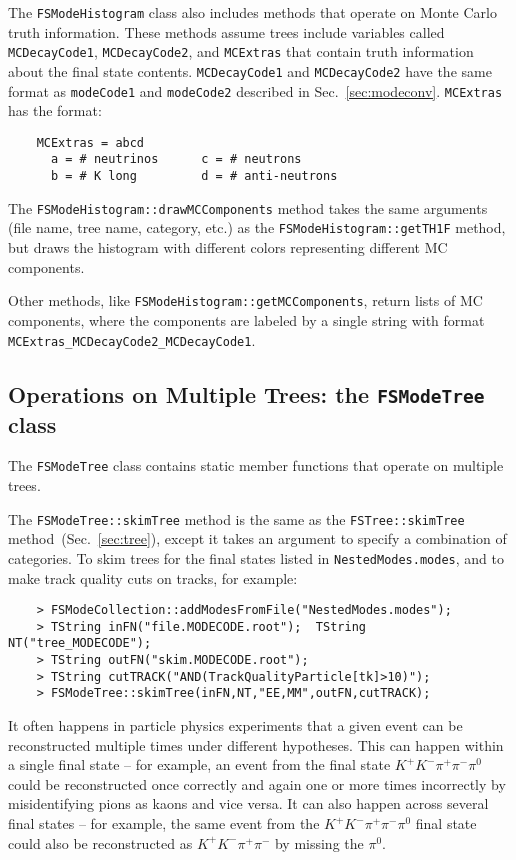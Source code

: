 \documentclass[11pt]{article}
\begin{document}
The {\tt FSModeHistogram} class also includes methods that operate on Monte Carlo truth information.  These methods assume trees include variables called {\tt MCDecayCode1}, {\tt MCDecayCode2}, and {\tt MCExtras} that contain truth information about the final state contents.  {\tt MCDecayCode1} and {\tt MCDecayCode2} have the same format as {\tt modeCode1} and {\tt modeCode2} described in Sec.~\ref{sec:modeconv}. {\tt MCExtras} has the format:
\begin{verbatim}
    MCExtras = abcd
      a = # neutrinos      c = # neutrons    
      b = # K long         d = # anti-neutrons
\end{verbatim}

The {\tt FSModeHistogram::drawMCComponents} method takes the same arguments (file name, tree name, category, etc.) as the {\tt FSModeHistogram::getTH1F} method, but draws the histogram with different colors representing different MC components.  

Other methods, like {\tt FSModeHistogram::getMCComponents}, return lists of MC components, where the components are labeled by a single string with format {\tt  MCExtras\_MCDecayCode2\_MCDecayCode1}.

\subsection{Operations on Multiple Trees: the {\tt FSModeTree} class}
\label{sec:modetree}

The {\tt FSModeTree} class contains static member functions that operate on multiple trees.

The {\tt FSModeTree::skimTree} method is the same as the {\tt FSTree::skimTree} method~(Sec.~\ref{sec:tree}), except it takes an argument to specify a combination of categories.  To skim trees for the final states listed in {\tt NestedModes.modes}, and to make track quality cuts on tracks, for example:
\begin{verbatim}
    > FSModeCollection::addModesFromFile("NestedModes.modes");
    > TString inFN("file.MODECODE.root");  TString NT("tree_MODECODE");
    > TString outFN("skim.MODECODE.root");
    > TString cutTRACK("AND(TrackQualityParticle[tk]>10)");
    > FSModeTree::skimTree(inFN,NT,"EE,MM",outFN,cutTRACK);
\end{verbatim}

It often happens in particle physics experiments that a given event can be reconstructed multiple times under different hypotheses.  This can happen within a single final state -- for example, an event from the final state $K^+K^-\pi^+\pi^-\pi^0$ could be reconstructed once correctly and again one or more times incorrectly by misidentifying pions as kaons and vice versa.  It can also happen across several final states -- for example, the same event from the $K^+K^-\pi^+\pi^-\pi^0$ final state could also be reconstructed as $K^+K^-\pi^+\pi^-$ by missing the $\pi^0$.  
\end{document}
